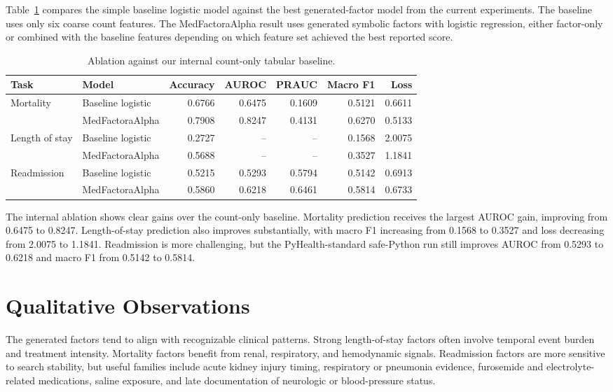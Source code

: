 \documentclass[letterpaper]{article}
\begin{document}
Table~\ref{tab:ablation} compares the simple baseline logistic model against the best generated-factor model from the current experiments. The baseline uses only six coarse count features. The MedFactoraAlpha result uses generated symbolic factors with logistic regression, either factor-only or combined with the baseline features depending on which feature set achieved the best reported score.

\begin{table}[t]
\centering
\small
\begin{tabular}{llrrrrr}
\toprule
Task & Model & Accuracy & AUROC & PRAUC & Macro F1 & Loss\\
\midrule
\multirow{2}{*}{Mortality}
& Baseline logistic & 0.6766 & 0.6475 & 0.1609 & 0.5121 & 0.6611\\
& MedFactoraAlpha & 0.7908 & 0.8247 & 0.4131 & 0.6270 & 0.5133\\
\midrule
\multirow{2}{*}{Length of stay}
& Baseline logistic & 0.2727 & -- & -- & 0.1568 & 2.0075\\
& MedFactoraAlpha & 0.5688 & -- & -- & 0.3527 & 1.1841\\
\midrule
\multirow{2}{*}{Readmission}
& Baseline logistic & 0.5215 & 0.5293 & 0.5794 & 0.5142 & 0.6913\\
& MedFactoraAlpha & 0.5860 & 0.6218 & 0.6461 & 0.5814 & 0.6733\\
\bottomrule
\end{tabular}
\caption{Ablation against our internal count-only tabular baseline.}
\label{tab:ablation}
\end{table}

The internal ablation shows clear gains over the count-only baseline. Mortality prediction receives the largest AUROC gain, improving from 0.6475 to 0.8247. Length-of-stay prediction also improves substantially, with macro F1 increasing from 0.1568 to 0.3527 and loss decreasing from 2.0075 to 1.1841. Readmission is more challenging, but the PyHealth-standard safe-Python run still improves AUROC from 0.5293 to 0.6218 and macro F1 from 0.5142 to 0.5814.

\section{Qualitative Observations}

The generated factors tend to align with recognizable clinical patterns. Strong length-of-stay factors often involve temporal event burden and treatment intensity. Mortality factors benefit from renal, respiratory, and hemodynamic signals. Readmission factors are more sensitive to search stability, but useful families include acute kidney injury timing, respiratory or pneumonia evidence, furosemide and electrolyte-related medications, saline exposure, and late documentation of neurologic or blood-pressure status.
\end{document}
